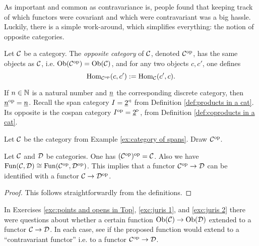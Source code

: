 As important and common as contravariance is, people found that keeping track of which functors were covariant and which were contravariant was a big hassle. Luckily, there is a simple work-around, which simplifies everything: the notion of opposite categories.

\begin{definition}

Let $\mathcal{C}$ be a category. The {\em opposite category} of $\mathcal{C}$, denoted $\mathcal{C}^\textnormal{op}$, has the same objects as $\mathcal{C}$, i.e. $\textnormal{Ob}(\mathcal{C}^\textnormal{op})=\textnormal{Ob}(\mathcal{C})$, and for any two objects $c,c'$, one defines
$$\textnormal{Hom}_{\mathcal{C}^\textnormal{op}}(c,c'):=\textnormal{Hom}_\mathcal{C}(c',c).$$

\end{definition}

\begin{example}

If $n\in{\mathbb N}$ is a natural number and $\underline{n}$ the corresponding discrete category, then $\underline{n}^\textnormal{op}=\underline{n}$. Recall  the span category $I=\underline{2}^\triangleleft$ from Definition \ref{def:products in a cat}. Its opposite is the cospan category $I^\textnormal{op}=\underline{2}^\triangleright$, from Definition \ref{def:coproducts in a cat}.

\end{example}

\begin{exercise}
Let $\mathcal{C}$ be the category from Example \ref{ex:category of spans}. Draw $\mathcal{C}^\textnormal{op}$.
\end{exercise}

\begin{lemma}

Let $\mathcal{C}$ and $\mathcal{D}$ be categories. One has $(\mathcal{C}^\textnormal{op})^\textnormal{op}=\mathcal{C}$. Also we have $\textnormal{Fun}(\mathcal{C},\mathcal{D})\cong\textnormal{Fun}(\mathcal{C}^\textnormal{op},\mathcal{D}^\textnormal{op})$. This implies that a functor $\mathcal{C}^\textnormal{op}\rightarrow\mathcal{D}$ can be identified with a functor $\mathcal{C}\rightarrow\mathcal{D}^\textnormal{op}$.

\end{lemma}

\begin{proof}

This follows straightforwardly from the definitions.

\end{proof}

\begin{exercise}
In Exercises \ref{exc:points and opens in Top}, \ref{exc:juris 1}, and \ref{exc:juris 2} there were questions about whether a certain function $\textnormal{Ob}(\mathcal{C})\rightarrow\textnormal{Ob}(\mathcal{D})$ extended to a functor $\mathcal{C}\rightarrow\mathcal{D}$. In each case, see if the proposed function would extend to a “contravariant functor” i.e. to a functor $\mathcal{C}^\textnormal{op}\rightarrow\mathcal{D}$.
\end{exercise}

